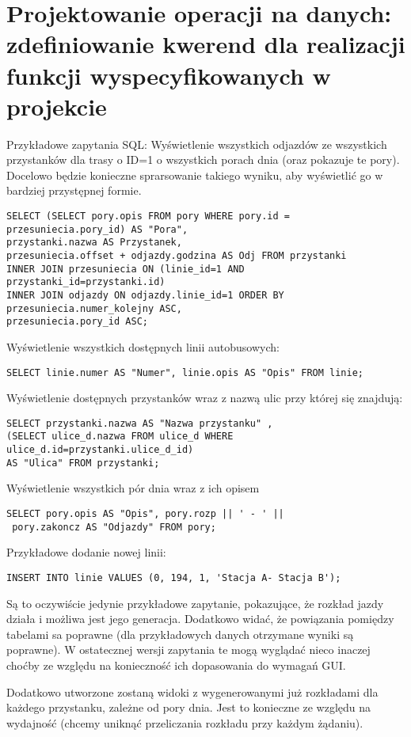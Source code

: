 \section{Projektowanie operacji na danych: zdefiniowanie kwerend dla realizacji funkcji wyspecyfikowanych w projekcie}

Przykładowe zapytania SQL:
Wyświetlenie wszystkich odjazdów ze wszystkich przystanków dla trasy o ID=1 o wszystkich porach dnia (oraz pokazuje te pory). Docelowo będzie konieczne sprarsowanie takiego wyniku, aby wyświetlić go w bardziej przystępnej formie.
\begin{verbatim}
SELECT (SELECT pory.opis FROM pory WHERE pory.id = przesuniecia.pory_id) AS "Pora",
przystanki.nazwa AS Przystanek, 
przesuniecia.offset + odjazdy.godzina AS Odj FROM przystanki 
INNER JOIN przesuniecia ON (linie_id=1 AND przystanki_id=przystanki.id) 
INNER JOIN odjazdy ON odjazdy.linie_id=1 ORDER BY przesuniecia.numer_kolejny ASC,
przesuniecia.pory_id ASC;
\end{verbatim}

Wyświetlenie wszystkich dostępnych linii autobusowych:
\begin{verbatim}
SELECT linie.numer AS "Numer", linie.opis AS "Opis" FROM linie;
\end{verbatim}


Wyświetlenie dostępnych przystanków wraz z nazwą ulic przy której się znajdują:
\begin{verbatim}
SELECT przystanki.nazwa AS "Nazwa przystanku" , 
(SELECT ulice_d.nazwa FROM ulice_d WHERE ulice_d.id=przystanki.ulice_d_id) 
AS "Ulica" FROM przystanki;
\end{verbatim}

Wyświetlenie wszystkich pór dnia wraz z ich opisem
\begin{verbatim}
SELECT pory.opis AS "Opis", pory.rozp || ' - ' ||
 pory.zakoncz AS "Odjazdy" FROM pory;
\end{verbatim}


Przykładowe dodanie nowej linii:
\begin{verbatim}
INSERT INTO linie VALUES (0, 194, 1, 'Stacja A- Stacja B');
\end{verbatim}

Są to oczywiście jedynie przykładowe zapytanie, pokazujące, że rozkład jazdy działa i możliwa jest jego generacja. Dodatkowo widać, że powiązania pomiędzy tabelami sa poprawne (dla przykładowych danych otrzymane wyniki są poprawne). W ostatecznej wersji zapytania te mogą wyglądać nieco inaczej choćby ze względu na konieczność ich dopasowania do wymagań GUI.

Dodatkowo utworzone zostaną widoki z wygenerowanymi już rozkładami dla każdego przystanku, zależne od pory dnia. Jest to konieczne ze względu na wydajność (chcemy uniknąć przeliczania rozkładu przy każdym żądaniu).